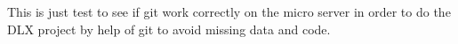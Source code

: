 This is just test to see if git work correctly on the micro server in order to do the DLX project by help of git to avoid missing data and code.
